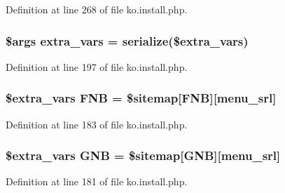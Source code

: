 Definition at line 268 of file ko.\+install.\+php.

\hypertarget{ko_8install_8php_ae1dcb37fc34a8f312d2e6abd6f806743}{}
\subsubsection[{extra\+\_\+vars}]{\setlength{\rightskip}{0pt plus 5cm}\$args extra\+\_\+vars = serialize(\$extra\+\_\+vars)}\label{ko_8install_8php_ae1dcb37fc34a8f312d2e6abd6f806743}


Definition at line 197 of file ko.\+install.\+php.

\hypertarget{ko_8install_8php_a683e060c22be3e658be6f9751a2082f0}{}
\subsubsection[{F\+N\+B}]{\setlength{\rightskip}{0pt plus 5cm}\${\bf extra\+\_\+vars} F\+N\+B = \$sitemap\mbox{[}\textquotesingle{}F\+N\+B\textquotesingle{}\mbox{]}\mbox{[}\textquotesingle{}menu\+\_\+srl\textquotesingle{}\mbox{]}}\label{ko_8install_8php_a683e060c22be3e658be6f9751a2082f0}


Definition at line 183 of file ko.\+install.\+php.

\hypertarget{ko_8install_8php_a9b1716b68fc04f3492448f38148dcbf5}{}
\subsubsection[{G\+N\+B}]{\setlength{\rightskip}{0pt plus 5cm}\${\bf extra\+\_\+vars} G\+N\+B = \$sitemap\mbox{[}\textquotesingle{}G\+N\+B\textquotesingle{}\mbox{]}\mbox{[}\textquotesingle{}menu\+\_\+srl\textquotesingle{}\mbox{]}}\label{ko_8install_8php_a9b1716b68fc04f3492448f38148dcbf5}


Definition at line 181 of file ko.\+install.\+php.

\hypertarget{ko_8install_8php_acd0b17bfe6d14c82871d73fa39c9c22d}{}

